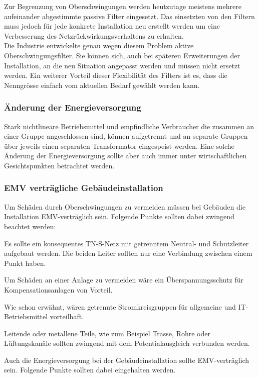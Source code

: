 Zur Begrenzung von Oberschwingungen werden heutzutage  meistens mehrere aufeinander abgestimmte passive Filter eingesetzt. Das einsetzten von den Filtern muss jedoch für jede konkrete Installation neu erstellt werden um eine Verbesserung des Netzrückwirkungsverhaltens zu erhalten.\\
Die Industrie entwickelte genau wegen diesem Problem aktive Oberschwingungsfilter. Sie können sich, auch bei späteren Erweiterungen der Installation, an die neu Situation angepasst werden und müssen nicht ersetzt werden. Ein weiterer Vorteil dieser Flexibilität des Filters ist es, dass die Nenngrösse einfach vom aktuellen Bedarf gewählt werden kann.     

\subsubsection{Änderung der Energieversorgung}

Stark nichtlineare Betriebsmittel und empfindliche Verbraucher die zusammen an einer Gruppe angeschlossen sind, können aufgetrennt und an separate Gruppen über jeweils einen separaten Transformator eingespeist werden. Eine solche Änderung der Energieversorgung sollte aber auch immer unter wirtschaftlichen Gesichtspunkten betrachtet werden.

\subsubsection{EMV verträgliche Gebäudeinstallation}

Um Schäden durch Oberschwingungen zu vermeiden müssen bei Gebäuden die Installation EMV-verträglich sein.
Folgende Punkte sollten dabei zwingend beachtet werden:

Es sollte ein konsequentes TN-S-Netz mit getrenntem Neutral- und Schutzleiter aufgebaut werden. Die beiden Leiter sollten nur eine Verbindung zwischen einem Punkt haben.

Um Schäden an einer Anlage zu vermeiden wäre ein Überspannungsschutz für Kompensationsanlagen von Vorteil.

Wie schon erwähnt, wären getrennte Stromkreisgruppen für allgemeine und IT-Betriebsmittel vorteilhaft.

Leitende oder metallene Teile, wie zum Beispiel Trasse, Rohre oder Lüftungskanäle sollten zwingend mit dem Potentialausgleich verbunden werden.

Auch die Energieversorgung bei der Gebäudeinstallation sollte EMV-verträglich sein. Folgende Punkte sollten dabei eingehalten werden. 

